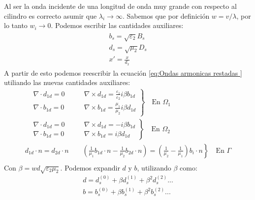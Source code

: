 Al ser la onda incidente de una longitud de onda muy grande con respecto al cilindro es correcto asumir que $\lambda_i\rightarrow\infty$. Sabemos que por definición $w=v/\lambda$, por lo tanto $w_i\rightarrow 0$. Podemos escribir las cantidades auxiliares:
\begin{equation}
\begin{gathered}
\begin{aligned}
b_s=\sqrt{\varepsilon_2}B_s\\
d_s=\sqrt{\mu_2}D_s\\
x'=\frac{x}{d_x}
\end{aligned}
\end{gathered}
\end{equation}
A partir de esto podemos reescribir la ecuación \eqref{eq:Ondas armonicas restadas } utiliando las nuevas cantidades auxiliares:
\begin{equation}
\label{eq:Ondas armonicas restadas con cantidades auxiliares}
\begin{split}
\left.
\begin{aligned}
&\nabla\cdot d_{1d}= 0\qquad & \nabla\times d_{1d}= \frac{\varepsilon_1}{\varepsilon_2}i\beta b_{1d}\\
&\nabla\cdot b_{1d} = 0\qquad &  \nabla\times b_{1d}=\frac{\mu_1}{\mu_2}i\beta d_{1d}
\end{aligned}
\right\}
\quad\text{En }\Omega_1\\
\left.
\begin{aligned}
&\nabla\cdot d_{1d}= 0\qquad & \nabla\times d_{1d}= -i\beta b_{1d}\\
&\nabla\cdot b_{1d} = 0\qquad &  \nabla\times b_{1d}= i\beta d_{1d}
\end{aligned}
\right\}
\quad\text{En }\Omega_2\\
\left. 
d_{1d}\cdot n=d_{2d}\cdot n \qquad \left(\frac{1}{\mu_1}b_{1d}\cdot n-\frac{1}{\mu_2}b_{2d}\cdot n\right)=\left(\frac{1}{\mu_2}-\frac{1}{\mu_1}\right)b_i\cdot n
\right\}
\quad\text{En }\Gamma\\
\end{split}
\end{equation}
Con $\beta=wd\sqrt{\varepsilon_2\mu_2}$. Podemos expandir $d$ y $b$, utilizando $\beta$ como:
\begin{equation}
\begin{gathered}
d=d_s^{(0)}+\beta d_s^{(1)}+\beta^2 d_s^{(2)}...\\
b=b_s^{(0)}+\beta b_s^{(1)}+\beta^2 b_s^{(2)}...\\
\end{gathered}
\end{equation}
